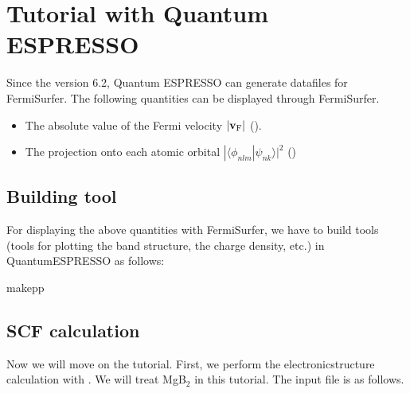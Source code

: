 \documentclass[letterpaper,10pt,pdftex,openany,english]{sphinxmanual}
\begin{document}
\chapter{Tutorial with Quantum ESPRESSO}
\label{\detokenize{qe:tutorial-with-quantum-espresso}}\label{\detokenize{qe::doc}}
\sphinxAtStartPar
Since the version 6.2, Quantum ESPRESSO can generate data\sphinxhyphen{}files
for FermiSurfer.
The following quantities can be displayed through FermiSurfer.
\begin{itemize}
\item {} 
\sphinxAtStartPar
The absolute value of the Fermi velocity \(|{\bf v}_{\rm F}|\) ().

\item {} 
\sphinxAtStartPar
The projection onto each atomic orbital
\(|\langle \phi_{n l m} | \psi_{n k} \rangle|^2\) ()

\end{itemize}


\section{Building   tool}
\label{\detokenize{qe:building-postprocess-tool}}
\sphinxAtStartPar
For displaying the above quantities with FermiSurfer,
we have to build  tools
(tools for plotting the band structure, the charge density, etc.)
in QuantumESPRESSO as follows:

\begin{sphinxVerbatim}[commandchars=\\\{\}]
\PYGZdl{}makepp
\end{sphinxVerbatim}


\section{SCF calculation}
\label{\detokenize{qe:scf-calculation}}
\sphinxAtStartPar
Now we will move on the tutorial.
First, we perform the electronic\sphinxhyphen{}structure calculation with .
We will treat MgB$_{\text{2}}$ in this tutorial.
The input file is as follows.

\sphinxAtStartPar
{}
\end{document}
